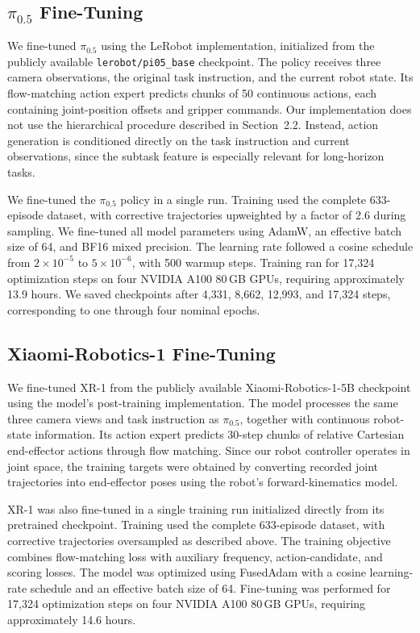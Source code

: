 \documentclass[10pt,twocolumn,letterpaper]{article}
\begin{document}
\subsection{$\pi_{0.5}$ Fine-Tuning}

We fine-tuned $\pi_{0.5}$ using the LeRobot implementation, initialized from the publicly available \texttt{lerobot/pi05\_base} checkpoint. The policy receives three camera observations, the original task instruction, and the current robot state. Its flow-matching action expert predicts chunks of 50 continuous actions, each containing joint-position offsets and gripper commands. Our implementation does not use the hierarchical procedure described in Section~2.2. Instead, action generation is conditioned directly on the task instruction and current observations, since the subtask feature is especially relevant for long-horizon tasks. 

We fine-tuned the $\pi_{0.5}$ policy in a single run. Training used the complete 633-episode dataset, with corrective trajectories upweighted by a factor of 2.6 during sampling. We fine-tuned all model parameters using AdamW, an effective batch size of 64, and BF16 mixed precision. The learning rate followed a cosine schedule from $2\times10^{-5}$ to $5\times10^{-6}$, with 500 warmup steps. Training ran for 17,324 optimization steps on four NVIDIA A100 80\,GB GPUs, requiring approximately 13.9 hours. We saved checkpoints after 4,331, 8,662, 12,993, and 17,324 steps, corresponding to one through four nominal epochs.

\subsection{Xiaomi-Robotics-1 Fine-Tuning}

We fine-tuned XR-1 from the publicly available Xiaomi-Robotics-1-5B checkpoint using the model's post-training implementation. The model processes the same three camera views and task instruction as $\pi_{0.5}$, together with continuous robot-state information. Its action expert predicts 30-step chunks of relative Cartesian end-effector actions through flow matching. Since our robot controller operates in joint space, the training targets were obtained by converting recorded joint trajectories into end-effector poses using the robot's forward-kinematics model.

XR-1 was also fine-tuned in a single training run initialized directly from its pretrained checkpoint. Training used the complete 633-episode dataset, with corrective trajectories oversampled as described above. The training objective combines flow-matching loss with auxiliary frequency, action-candidate, and scoring losses. The model was optimized using FusedAdam with a cosine learning-rate schedule and an effective batch size of 64. Fine-tuning was performed for 17,324 optimization steps on four NVIDIA A100 80\,GB GPUs, requiring approximately 14.6 hours.
\end{document}
